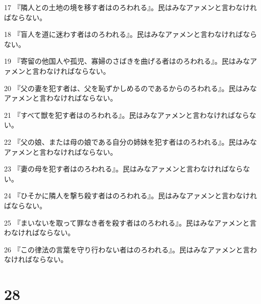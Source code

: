 \par 17 『隣人との土地の境を移す者はのろわれる』。民はみなアァメンと言わなければならない。
\par 18 『盲人を道に迷わす者はのろわれる』。民はみなアァメンと言わなければならない。
\par 19 『寄留の他国人や孤児、寡婦のさばきを曲げる者はのろわれる』。民はみなアァメンと言わなければならない。
\par 20 『父の妻を犯す者は、父を恥ずかしめるのであるからのろわれる』。民はみなアァメンと言わなければならない。
\par 21 『すべて獣を犯す者はのろわれる』。民はみなアァメンと言わなければならない。
\par 22 『父の娘、または母の娘である自分の姉妹を犯す者はのろわれる』。民はみなアァメンと言わなければならない。
\par 23 『妻の母を犯す者はのろわれる』。民はみなアァメンと言わなければならない。
\par 24 『ひそかに隣人を撃ち殺す者はのろわれる』。民はみなアァメンと言わなければならない。
\par 25 『まいないを取って罪なき者を殺す者はのろわれる』。民はみなアァメンと言わなければならない。
\par 26 『この律法の言葉を守り行わない者はのろわれる』。民はみなアァメンと言わなければならない。

\chapter{28}

